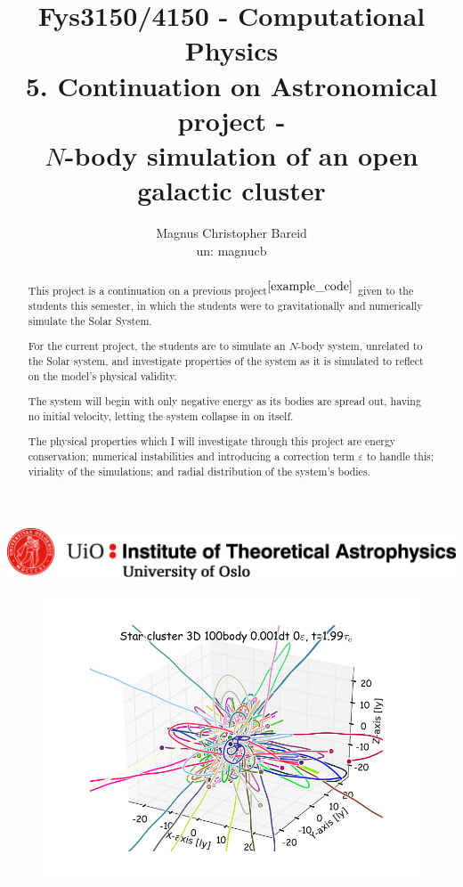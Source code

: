 \documentclass[11pt,a4paper,notitlepage,twocolumn]{article}
\title{\normalsize Fys3150/4150 - Computational Physics\\
\vspace{10mm}
\huge 5. Continuation on Astronomical project -\\ $N$-body simulation of an open galactic cluster}
\author{Magnus Christopher Bareid \\ un: magnucb }
\begin{document}
\vspace{5mm}

\begin{titlingpage}
	\begin{center}
    	\includegraphics[scale=0.5]{../ITA_seal.png}
    	\let\newpage\relax\maketitle

		\begin{figure}[H]
		\center
		\includegraphics[scale=0.35]{../frontpage1.png}
		\end{figure}

		\begin{abstract}
This project is a continuation on a previous project$^{\cite{example_code}}$ given to the students this semester, in which the students were to gravitationally and numerically simulate the Solar System.

For the current project, the students are to simulate an $N$-body system, unrelated to the Solar system, and investigate properties of the system as it is simulated to reflect on the model's physical validity.

The system will begin with only negative energy as its bodies are spread out, having no initial velocity, letting the system collapse in on itself.

The physical properties which I will investigate through this project are energy conservation; numerical instabilities and introducing a correction term $\varepsilon$ to handle this; viriality of the simulations; and radial distribution of the system's bodies.


\end{abstract}
\end{center}
\end{titlingpage}
\end{document}
